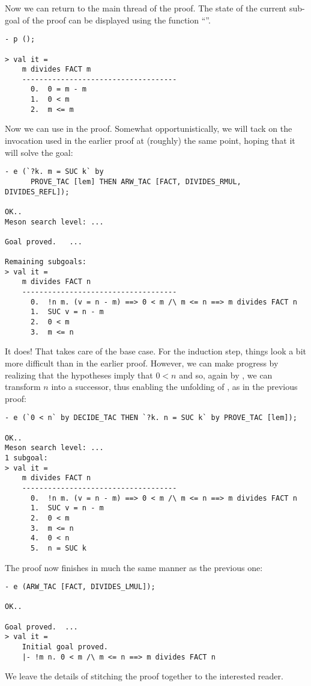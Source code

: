 Now we can return to the main thread of the proof.  The state of the
current sub-goal of the proof can be displayed using the function
``''.

\begin{session}\begin{verbatim}
- p ();

> val it =
    m divides FACT m
    ------------------------------------
      0.  0 = m - m
      1.  0 < m
      2.  m <= m
\end{verbatim}\end{session}
    Now we can use  in the proof. Somewhat opportunistically,
    we will tack on the invocation used in the earlier proof at
    (roughly) the same point, hoping that it will solve the goal:
\begin{session}\begin{verbatim}
- e (`?k. m = SUC k` by
      PROVE_TAC [lem] THEN ARW_TAC [FACT, DIVIDES_RMUL, DIVIDES_REFL]);

OK..
Meson search level: ...

Goal proved.   ...

Remaining subgoals:
> val it =
    m divides FACT n
    ------------------------------------
      0.  !n m. (v = n - m) ==> 0 < m /\ m <= n ==> m divides FACT n
      1.  SUC v = n - m
      2.  0 < m
      3.  m <= n
\end{verbatim}\end{session}
    It does! That takes care of the base case. For the induction step,
    things look a bit more difficult than in the earlier proof.
    However, we can make progress by realizing that the hypotheses
    imply that $0 < n$ and so, again by , we can transform $n$
    into a successor, thus enabling the unfolding of , as in
    the previous proof:
\begin{session}\begin{verbatim}
- e (`0 < n` by DECIDE_TAC THEN `?k. n = SUC k` by PROVE_TAC [lem]);

OK..
Meson search level: ...
1 subgoal:
> val it =
    m divides FACT n
    ------------------------------------
      0.  !n m. (v = n - m) ==> 0 < m /\ m <= n ==> m divides FACT n
      1.  SUC v = n - m
      2.  0 < m
      3.  m <= n
      4.  0 < n
      5.  n = SUC k
\end{verbatim}\end{session}
\noindent The proof now finishes in much the same manner as the previous one:
\begin{session}\begin{verbatim}
- e (ARW_TAC [FACT, DIVIDES_LMUL]);

OK..

Goal proved.  ...
> val it =
    Initial goal proved.
    |- !m n. 0 < m /\ m <= n ==> m divides FACT n
\end{verbatim}\end{session}
\noindent We leave the details of stitching the proof together to the interested
reader.

